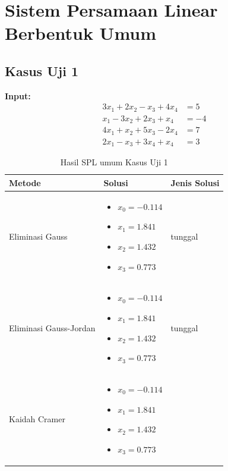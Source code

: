 \documentclass[12pt,a4paper]{report}
\begin{document}
\section{Sistem Persamaan Linear Berbentuk Umum}
 
\subsection{Kasus Uji 1}
\textbf{Input:}
\begin{align*}
3x_1 + 2x_2 - x_3 + 4x_4 &= 5 \\
x_1 - 3x_2 + 2x_3 + x_4 &= -4 \\
4x_1 + x_2 + 5x_3 - 2x_4 &= 7 \\
2x_1 - x_3 + 3x_4 + x_4&= 3
\end{align*}

\begin{table}[H]
    \centering
    \caption{Hasil SPL umum Kasus Uji 1}
    \begin{tabular}{|l|p{5cm}|l|}
        \hline
        \textbf{Metode} & \textbf{Solusi} & \textbf{Jenis Solusi} \\
        \hline
        Eliminasi Gauss & 
        \begin{itemize}
            \item $x_0 = -0.114$
            \item $x_1 = 1.841$
            \item $x_2 = 1.432$
            \item $x_3 = 0.773$
        \end{itemize}
        & tunggal \\
        \hline
        Eliminasi Gauss-Jordan & 
        \begin{itemize}
            \item $x_0 = -0.114$
            \item $x_1 = 1.841$
            \item $x_2 = 1.432$
            \item $x_3 = 0.773$
        \end{itemize}
        & tunggal \\
        \hline
        Kaidah Cramer & 
        \begin{itemize}
            \item $x_0 = -0.114$
            \item $x_1 = 1.841$
            \item $x_2 = 1.432$
            \item $x_3 = 0.773$
        \end{itemize}

\end{tabular}
\end{table}
\end{document}
